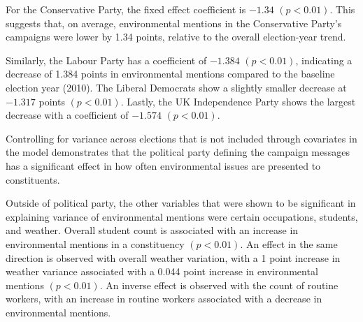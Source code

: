 \documentclass[preprint]{elsarticle} %
\begin{document}
For the Conservative Party, the fixed effect coefficient is \(-1.34\) \((p < 0.01)\). This suggests that, on average, environmental mentions in the Conservative Party's campaigns were lower by 1.34 points, relative to the overall election-year trend.

Similarly, the Labour Party has a coefficient of \(-1.384\) \((p < 0.01)\), indicating a decrease of 1.384 points in environmental mentions compared to the baseline election year (2010). The Liberal Democrats show a slightly smaller decrease at \(-1.317\) points \((p < 0.01)\). Lastly, the UK Independence Party shows the largest decrease with a coefficient of \(-1.574\) \((p < 0.01)\).

Controlling for variance across elections that is not included through covariates in the model demonstrates that the political party defining the campaign messages has a significant effect in how often environmental issues are presented to constituents. 

Outside of political party, the other variables that were shown to be significant in explaining variance of environmental mentions were certain occupations, students, and weather. Overall student count is associated with an increase in environmental mentions in a constituency $(p < 0.01)$. An effect in the same direction is observed with overall weather variation, with a 1 point increase in weather variance associated with a 0.044 point increase in environmental mentions $(p < 0.01)$. An inverse effect is observed with the count of routine workers, with an increase in routine workers associated with a decrease in environmental mentions.
\end{document}
